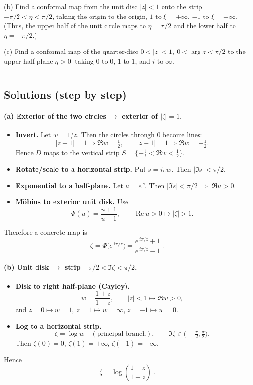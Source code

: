 \documentclass[11pt]{article}
\begin{document}
	\medskip
	\noindent
	(b)\; Find a conformal map from the unit disc $|z|<1$ onto the strip $-\pi/2<\eta<\pi/2$,
	taking the origin to the origin, $1$ to $\xi=+\infty$, $-1$ to $\xi=-\infty$.
	(Thus, the upper half of the unit circle maps to $\eta=\pi/2$ and the lower half to $\eta=-\pi/2$.)
	
	\medskip
	\noindent
	(c)\; Find a conformal map of the quarter-disc $0<|z|<1,\ 0<\arg z<\pi/2$
	to the upper half-plane $\eta>0$, taking $0$ to $0$, $1$ to $1$, and $i$ to $\infty$.
	
	\bigskip\hrule\bigskip
	
	\subsection*{Solutions (step by step)}
	
	\paragraph{(a) Exterior of the two circles $\to$ exterior of $|\zeta|=1$.}
	\begin{itemize}
		\setlength{\itemsep}{0.4em}
		\item \textbf{Invert.} Let $w=1/z$. Then the circles through $0$ become lines:
		\[
		|z-1|=1 \Rightarrow \Re w=\tfrac12,\qquad
		|z+1|=1 \Rightarrow \Re w=-\tfrac12.
		\]
		Hence $D$ maps to the vertical strip $S=\{-\tfrac12<\Re w<\tfrac12\}$.
		\item \textbf{Rotate/scale to a horizontal strip.} Put $s=i\pi w$.
		Then $|\Im s|<\pi/2$.
		\item \textbf{Exponential to a half-plane.} Let $u=e^{\,s}$.
		Then $|\Im s|<\pi/2 \;\Longrightarrow\; \Re u>0$.
		\item \textbf{Möbius to exterior unit disk.} Use
	\[
	\Phi(u)=\frac{u+1}{u-1},\qquad \operatorname{Re} u>0 \longmapsto |\zeta|>1.
	\]
	
	\end{itemize}
	Therefore a concrete map is
	\[
	\boxed{\ \zeta=\Phi\!\big(e^{\,i\pi/z}\big)=\dfrac{e^{\,i\pi/z}+1}{e^{\,i\pi/z}-1}\ }.
	\]
	
	\bigskip
	
	\paragraph{(b) Unit disk $\to$ strip $-\pi/2<\Im\zeta<\pi/2$.}
	\begin{itemize}
		\setlength{\itemsep}{0.4em}
		\item \textbf{Disk to right half-plane (Cayley).}
		\[
		w=\frac{1+z}{1-z},\qquad |z|<1 \mapsto \Re w>0,
		\]
		and $z=0\mapsto w=1$, $z=1\mapsto w=\infty$, $z=-1\mapsto w=0$.
		\item \textbf{Log to a horizontal strip.}
		\[
		\zeta=\log w \quad (\text{principal branch}),\qquad \Im\zeta\in\big(-\tfrac{\pi}{2},\tfrac{\pi}{2}\big).
		\]
		Then $\zeta(0)=0$, $\zeta(1)=+\infty$, $\zeta(-1)=-\infty$.
	\end{itemize}
	Hence
	\[
	\boxed{\ \zeta=\log\!\left(\frac{1+z}{1-z}\right)\ }.
	\]
	
\end{document}
